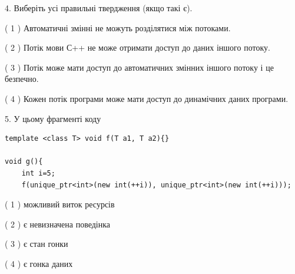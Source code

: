 \documentclass[12pt, ukrainian]{article}
\begin{document}
\begin {large}
{%
4. Виберіть усі правильні твердження (якщо такі є).\par
\vspace{2mm}

( 1 ) Автоматичні змінні не можуть розділятися між потоками.%

( 2 ) Потік мови С++ не може отримати доступ до даних іншого потоку.%

( 3 ) Потік може мати доступ до автоматичних змінних іншого потоку і це безпечно.%

( 4 ) Кожен потік програми може мати доступ до динамічних даних програми.%


5. У цьому фрагменті коду
\begin{verbatim}
template <class T> void f(T a1, T a2){}

void g(){
    int i=5;
    f(unique_ptr<int>(new int(++i)), unique_ptr<int>(new int(++i)));
\end{verbatim}

( 1 ) можливий виток ресурсів%

( 2 ) є невизначена поведінка%

( 3 ) є стан гонки%

( 4 ) є гонка даних%
}
\end {large}
\end{document}
